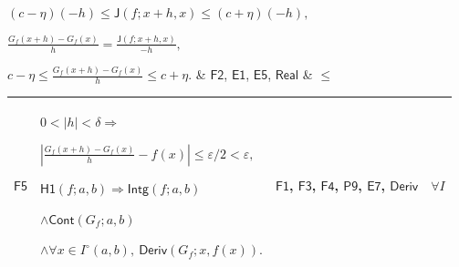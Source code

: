 \documentclass[11pt]{amsart}
\newlength{\FTCFourColumnBody}
\begin{document}
{\begin{tabular}
$\displaystyle (c-\eta)(-h)\le\textsf{J}(f;x+h,x)\le(c+\eta)(-h),$\par
$\displaystyle \frac{G_f(x+h)-G_f(x)}h=\frac{\textsf{J}(f;x+h,x)}{-h},$\par
$\displaystyle c-\eta\le\frac{G_f(x+h)-G_f(x)}h\le c+\eta.$ & \hyperlink{proof:F2}{$\displaystyle \textsf{F2}$}, \hyperlink{proof:E1}{$\displaystyle \textsf{E1}$}, \hyperlink{proof:E5}{$\displaystyle \textsf{E5}$}, \hyperlink{ax:Real}{$\displaystyle \textsf{Real}$} & $\displaystyle \le$\\ \hline
\end{tabular}%
\par\setlength{\parskip}{0pt}\nointerlineskip
\noindent
\begin{tabular}{|@{}>{\centering\arraybackslash}m{0.078431\FTCFourColumnBody}|>{\centering\arraybackslash}m{0.535947\FTCFourColumnBody}|>{\centering\arraybackslash}m{0.281045\FTCFourColumnBody}|>{\centering\arraybackslash}m{0.104575\FTCFourColumnBody}|}\hline
\hypertarget{proof:F5}{$\displaystyle \textsf{F5}$} & $\displaystyle 0<|h|<\delta\Rightarrow$\par
$\displaystyle \left|\frac{G_f(x+h)-G_f(x)}h-f(x)\right|\le\varepsilon/2<\varepsilon,$\par
$\displaystyle \textsf{H1}(f;a,b)\Rightarrow\textsf{Intg}(f;a,b)$\par
$\displaystyle \land\textsf{Cont}(G_f;a,b)$\par
$\displaystyle \land\forall x\in I^\circ(a,b),\ \textsf{Deriv}(G_f;x,f(x)).$ & \hyperlink{proof:F1}{$\displaystyle \textsf{F1}$}, \hyperlink{proof:F3}{$\displaystyle \textsf{F3}$}, \hyperlink{proof:F4}{$\displaystyle \textsf{F4}$}, \hyperlink{proof:P9}{$\displaystyle \textsf{P9}$}, \hyperlink{proof:E7}{$\displaystyle \textsf{E7}$}, \hyperlink{def:Deriv}{$\displaystyle \textsf{Deriv}$} & $\displaystyle \forall I$\\ \hline
\end{tabular}%
\par
}
\end{document}
